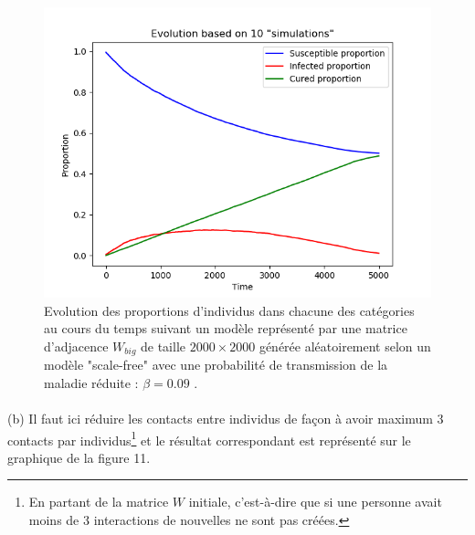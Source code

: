 \documentclass[a4paper, 12pt, oneside]{article}
\begin{document}
\begin{figure}[H]
	\centering
	\includegraphics[scale=1]{Wbig_dense_reduction_transmission_comparaison.png} 
	\caption{Evolution des proportions d'individus dans chacune des catégories au cours du temps suivant un modèle représenté par une matrice d'adjacence $W_{big}$ de taille $2000 \times 2000$ générée aléatoirement selon un modèle "scale-free" avec une probabilité de transmission de la maladie réduite : $\beta = 0.09$ .}
\end{figure}

\paragraph{}(b) Il faut ici réduire les contacts entre individus de façon à avoir maximum 3 contacts par individus\footnote{En partant de la matrice $W$ initiale, c'est-à-dire que si une personne avait moins de 3 interactions de nouvelles ne sont pas créées.} et le résultat correspondant est représenté sur le graphique de la figure 11.
\end{document}
